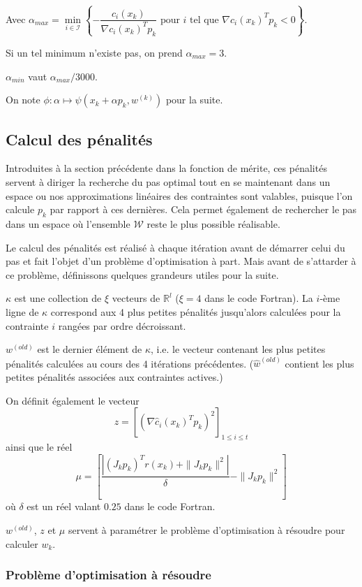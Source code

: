 \documentclass[a4paper,11pt]{article}
\newcommand{\real}{\mathbb{R}}
\newcommand{\hc}{\hat{c}}
\numberwithin{equation}{section}
\begin{document}
Avec $\alpha_{max} = \underset{i \in \mathcal{I}}{\min}\left\{-\dfrac{c_i(x_{k})}{\nabla c_i(x_{k})^Tp_{k}} \text{ pour }i \text{ tel que } \nabla c_i(x_{k})^Tp_{k} < 0 \right\}$. 

Si un tel minimum n'existe pas, on prend $\alpha_{max} = 3$. 

$\alpha_{min}$ vaut $\alpha_{max} / 3000$.

On note $\phi: \alpha \mapsto \psi(x_{k}+\alpha p_{k},w^{(k)})$ pour la suite.

\subsection{Calcul des pénalités} \label{calcul poids}

Introduites à la section précédente dans la fonction de mérite, ces pénalités servent à diriger la recherche du pas optimal tout en se maintenant dans un espace ou nos approximations linéaires des contraintes sont valables, puisque l'on calcule $p_{k}$ par rapport à ces dernières. Cela permet également de rechercher le pas dans un espace où l'ensemble $\mathcal{W}$ reste le plus possible réalisable. 

Le calcul des pénalités est réalisé à chaque itération avant de démarrer celui du pas et fait l'objet d'un problème d'optimisation à part. Mais avant de s'attarder à ce problème, définissons quelques grandeurs utiles pour la suite.

$\kappa$ est une collection de $\xi$ vecteurs de $\real^{l}$ ($\xi=4$ dans le code Fortran). La $i$-ème ligne de $\kappa$ correspond aux 4 plus petites pénalités jusqu'alors calculées pour la contrainte $i$ rangées par ordre décroissant. 

$w^{(old)}$ est le dernier élément de $\kappa$, i.e. le vecteur contenant les plus petites pénalités calculées au cours des 4 itérations précédentes. ($\hat{w}^{(old)}$ contient les plus petites pénalités associées aux contraintes actives.)

On définit également le vecteur $$z=\left[(\nabla \hc_i(x_{k})^Tp_{k})^2 \right]_{1 \leq i \leq t}$$ ainsi que le réel $$\mu =  \left[\dfrac{|(J_{k}p_{k})^Tr(x_k) + \|J_{k}p_{k}\|^2|}{\delta} - \|J_{k}p_{k}\|^2 \right]$$ où $\delta$ est un réel valant $0.25$ dans le code Fortran. 

$w^{(old)}$, $z$ et $\mu$ servent à paramétrer le problème d'optimisation à résoudre pour calculer $w_{k}$.

\subsubsection{Problème d'optimisation à résoudre}
\end{document}
